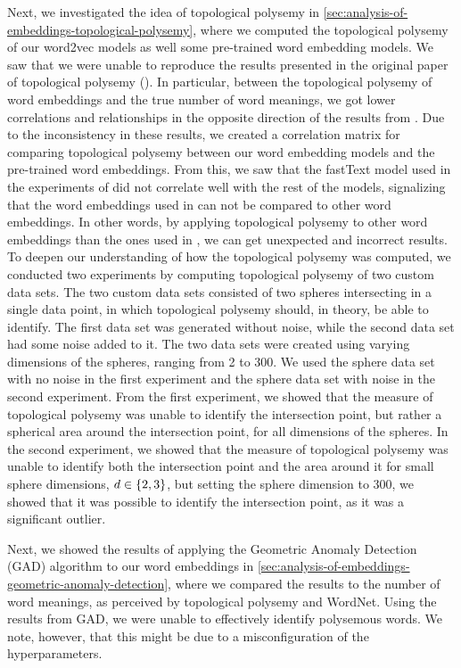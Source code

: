Next, we investigated the idea of topological polysemy in \cref{sec:analysis-of-embeddings-topological-polysemy}, where we computed the topological polysemy of our word2vec models as well some pre-trained word embedding models. We saw that we were unable to reproduce the results presented in the original paper of topological polysemy (\cite{jakubowski2020topology}). In particular, between the topological polysemy of word embeddings and the true number of word meanings, we got lower correlations and relationships in the opposite direction of the results from \cite{jakubowski2020topology}. Due to the inconsistency in these results, we created a correlation matrix for comparing topological polysemy between our word embedding models and the pre-trained word embeddings. From this, we saw that the fastText model used in the experiments of \cite{jakubowski2020topology} did not correlate well with the rest of the models, signalizing that the word embeddings used in \cite{jakubowski2020topology} can not be compared to other word embeddings. In other words, by applying topological polysemy to other word embeddings than the ones used in \cite{jakubowski2020topology}, we can get unexpected and incorrect results. To deepen our understanding of how the topological polysemy was computed, we conducted two experiments by computing topological polysemy of two custom data sets. The two custom data sets consisted of two spheres intersecting in a single data point, in which topological polysemy should, in theory, be able to identify. The first data set was generated without noise, while the second data set had some noise added to it. The two data sets were created using varying dimensions of the spheres, ranging from 2 to 300. We used the sphere data set with no noise in the first experiment and the sphere data set with noise in the second experiment. From the first experiment, we showed that the measure of topological polysemy was unable to identify the intersection point, but rather a spherical area around the intersection point, for all dimensions of the spheres. In the second experiment, we showed that the measure of topological polysemy was unable to identify both the intersection point and the area around it for small sphere dimensions, $d \in \left\{2, 3\right\}$, but setting the sphere dimension to 300, we showed that it was possible to identify the intersection point, as it was a significant outlier.

Next, we showed the results of applying the Geometric Anomaly Detection (GAD) algorithm to our word embeddings in \cref{sec:analysis-of-embeddings-geometric-anomaly-detection}, where we compared the results to the number of word meanings, as perceived by topological polysemy and WordNet. Using the results from GAD, we were unable to effectively identify polysemous words. We note, however, that this might be due to a misconfiguration of the hyperparameters.

